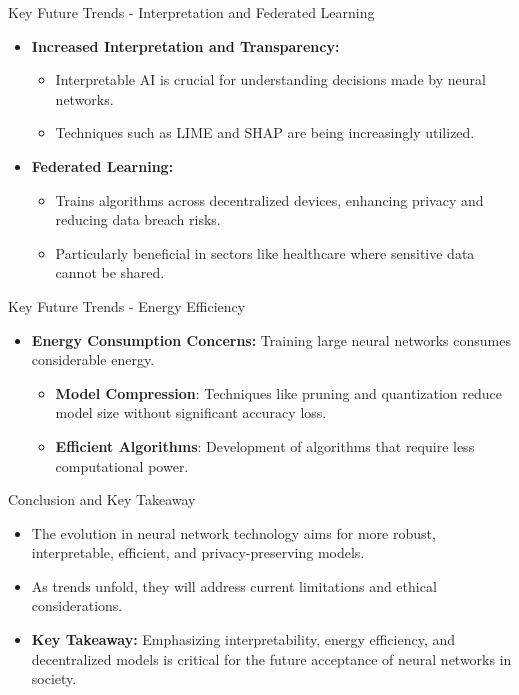 \documentclass[aspectratio=169]{beamer}
\begin{document}
\begin{frame}{Key Future Trends - Interpretation and Federated Learning}
    \begin{itemize}
        \item \textbf{Increased Interpretation and Transparency:}
        \begin{itemize}
            \item Interpretable AI is crucial for understanding decisions made by neural networks.
            \item Techniques such as LIME and SHAP are being increasingly utilized.
        \end{itemize}
        \item \textbf{Federated Learning:}
        \begin{itemize}
            \item Trains algorithms across decentralized devices, enhancing privacy and reducing data breach risks.
            \item Particularly beneficial in sectors like healthcare where sensitive data cannot be shared.
        \end{itemize}
    \end{itemize}
\end{frame}

\begin{frame}{Key Future Trends - Energy Efficiency}
    \begin{itemize}
        \item \textbf{Energy Consumption Concerns:} Training large neural networks consumes considerable energy.
        \begin{itemize}
            \item \textbf{Model Compression}: Techniques like pruning and quantization reduce model size without significant accuracy loss.
            \item \textbf{Efficient Algorithms}: Development of algorithms that require less computational power.
        \end{itemize}
    \end{itemize}
\end{frame}

\begin{frame}{Conclusion and Key Takeaway}
    \begin{itemize}
        \item The evolution in neural network technology aims for more robust, interpretable, efficient, and privacy-preserving models.
        \item As trends unfold, they will address current limitations and ethical considerations.
        \item \textbf{Key Takeaway:} Emphasizing interpretability, energy efficiency, and decentralized models is critical for the future acceptance of neural networks in society.
    \end{itemize}
\end{frame}
\end{document}
